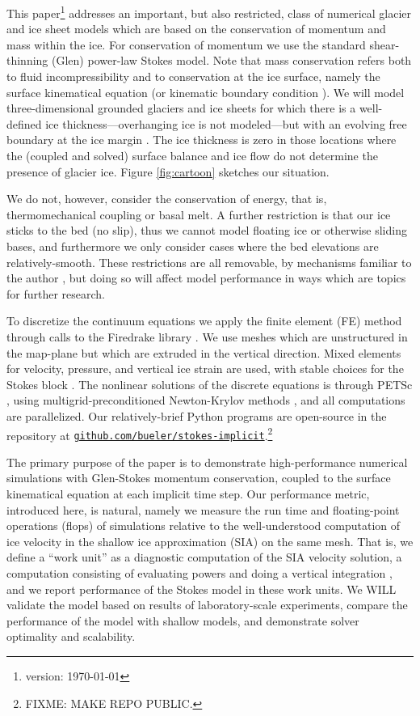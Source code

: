 \documentclass[letterpaper,final,12pt,reqno]{amsart}
\begin{document}
This paper\footnote{version: \today} addresses an important, but also restricted, class of numerical glacier and ice sheet models which are based on the conservation of momentum and mass within the ice.  For conservation of momentum we use the standard shear-thinning (Glen) power-law Stokes model.  Note that mass conservation refers both to fluid incompressibility and to conservation at the ice surface, namely the surface kinematical equation (or kinematic boundary condition \cite{GreveBlatter2009}).  We will model three-dimensional grounded glaciers and ice sheets for which there is a well-defined ice thickness---overhanging ice is not modeled---but with an evolving free boundary at the ice margin \cite{SchoofHewitt2013}.  The ice thickness is zero in those locations where the (coupled and solved) surface balance and ice flow do not determine the presence of glacier ice.  Figure \ref{fig:cartoon} sketches our situation.

We do not, however, consider the conservation of energy, that is, thermomechanical coupling or basal melt.  A further restriction is that our ice sticks to the bed (no slip), thus we cannot model floating ice or otherwise sliding bases, and furthermore we only consider cases where the bed elevations are relatively-smooth.  These restrictions are all removable, by mechanisms familiar to the author \cite[for example]{Aschwandenetal2012,Winkelmannetal2011}, but doing so will affect model performance in ways which are topics for further research.

To discretize the continuum equations we apply the finite element (FE) method \cite{Elmanetal2014} through calls to the Firedrake library \cite{Rathgeberetal2016}.  We use meshes which are unstructured in the map-plane but which are extruded in the vertical direction.  Mixed elements for velocity, pressure, and vertical ice strain are used, with stable choices for the Stokes block \cite{Elmanetal2014}.  The nonlinear solutions of the discrete equations is through PETSc \cite{Balayetal2020}, using multigrid-preconditioned Newton-Krylov methods \cite{Bueler2021}, and all computations are parallelized.  Our relatively-brief Python programs are open-source in the repository at \href{https://github.com/bueler/stokes-implicit}{\texttt{github.com/bueler/stokes-implicit}}.\footnote{FIXME: MAKE REPO PUBLIC.}

The primary purpose of the paper is to demonstrate high-performance numerical simulations with Glen-Stokes momentum conservation, coupled to the surface kinematical equation at each implicit time step.  Our performance metric, introduced here, is natural, namely we measure the run time and floating-point operations (flops) of simulations relative to the well-understood computation of ice velocity in the shallow ice approximation (SIA) on the same mesh.  That is, we define a ``work unit'' as a diagnostic computation of the SIA velocity solution, a computation consisting of evaluating powers and doing a vertical integration \cite{SchoofHewitt2013}, and we report performance of the Stokes model in these work units.  We WILL validate the model based on results of laboratory-scale experiments, compare the performance of the model with shallow models, and demonstrate solver optimality and scalability.
\end{document}
